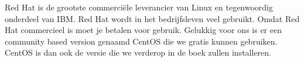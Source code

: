 Red Hat is de grootste commerci\"ele leverancier van Linux en tegenwoordig onderdeel van IBM. Red Hat wordt in het
bedrijfsleven veel gebruikt. Omdat Red Hat commercieel is moet je betalen voor gebruik. Gelukkig voor ons is er een
community based version genaamd CentOS die we gratis kunnen gebruiken. CentOS is dan ook de versie die we verderop in
de boek zullen installeren.
